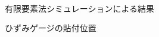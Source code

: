 \begin{figure}[b]
  \centering
  \\
  \caption[]{有限要素法シミュレーションによる結果}\label{fig:sim}
\end{figure}
\begin{figure}[b]
  \centering
  \caption[]{ひずみゲージの貼付位置}\label{fig:gage}
\end{figure}
